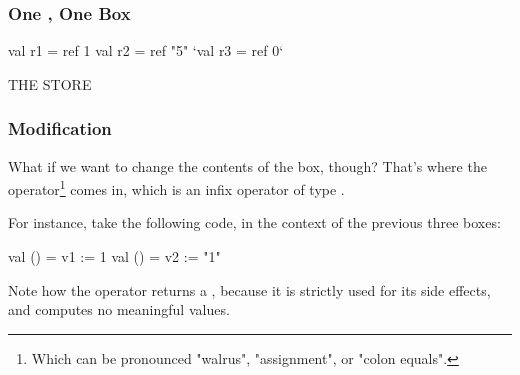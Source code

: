 \documentclass[aspectratio=169]{beamer}
\begin{document}
\begin{frame}[fragile]
  \frametitle{One , One Box}

  \begin{center}
    \begin{minipage}[t][2.5in][t]{0.55\textwidth}
      \vspace{\fill}
      \begin{codeblock}
        val r1 = ref 1
        val r2 = ref "5"
        `val r3 = ref 0`
      \end{codeblock}
      \vspace{\fill}
    \end{minipage}
    \hfill\vline\hfill
    \begin{minipage}[t][2.5in][t]{0.35\textwidth}
      \centering
      {\hspace{-20pt}\color{gray} \large THE STORE}

      \vspace{\fill}
      \vspace{\fill}
    \end{minipage}
  \end{center}
\end{frame}

\begin{frame}[fragile]
  \frametitle{ Modification}

  What if we want to change the contents of the box, though? That's where the
  \code{:=} operator\footnote{Which can be pronounced "walrus", "assignment", or "colon equals".}
  comes in, which is an infix operator of type .

  \pause
  \vspace{\fill}

  For instance, take the following code, in the context of the previous three boxes:
  \begin{codeblock}
    val () = v1 := 1
    val () = v2 := "1"
  \end{codeblock}

  \pause
  \vspace{\fill}

  Note how the \code{:=} operator returns a \code{()}, because it is strictly used
  for its side effects, and computes no meaningful values.
\end{frame}
\end{document}
